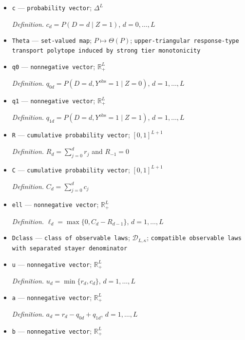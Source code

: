 \documentclass{article}
\begin{document}
\begin{itemize}
  \par\smallskip\noindent\emph{Definition.} \(r_d=P(D=d\mid Z=0)\), \(d=0,\ldots,L\)
  \item \texttt{c} --- \texttt{probability vector}; \(\Delta^{L}\)
  \par\smallskip\noindent\emph{Definition.} \(c_d=P(D=d\mid Z=1)\), \(d=0,\ldots,L\)
  \item \texttt{Theta} --- \texttt{set-\allowbreak{}valued map}; \(P\mapsto\Theta(P)\); \texttt{upper-\allowbreak{}triangular response-\allowbreak{}type transport polytope induced by strong tier monotonicity}
  \item \texttt{q0} --- \texttt{nonnegative vector}; \(\mathbb R_+^{L}\)
  \par\smallskip\noindent\emph{Definition.} \(q_{0d}=P(D=d,Y^{\mathrm{obs}}=1\mid Z=0)\), \(d=1,\ldots,L\)
  \item \texttt{q1} --- \texttt{nonnegative vector}; \(\mathbb R_+^{L}\)
  \par\smallskip\noindent\emph{Definition.} \(q_{1d}=P(D=d,Y^{\mathrm{obs}}=1\mid Z=1)\), \(d=1,\ldots,L\)
  \item \texttt{R} --- \texttt{cumulative probability vector}; \([0,1]^{L+1}\)
  \par\smallskip\noindent\emph{Definition.} \(R_d=\sum_{j=0}^{d}r_j\) and \(R_{-1}=0\)
  \item \texttt{C} --- \texttt{cumulative probability vector}; \([0,1]^{L+1}\)
  \par\smallskip\noindent\emph{Definition.} \(C_d=\sum_{j=0}^{d}c_j\)
  \item \texttt{ell} --- \texttt{nonnegative vector}; \(\mathbb R_+^{L}\)
  \par\smallskip\noindent\emph{Definition.} \(\ell_d=\max\{0,C_d-R_{d-1}\}\), \(d=1,\ldots,L\)
  \item \texttt{Dclass} --- \texttt{class of observable laws}; \(\mathcal D_{L,\kappa}\); \texttt{compatible observable laws with separated stayer denominator}
  \item \texttt{u} --- \texttt{nonnegative vector}; \(\mathbb R_+^{L}\)
  \par\smallskip\noindent\emph{Definition.} \(u_d=\min\{r_d,c_d\}\), \(d=1,\ldots,L\)
  \item \texttt{a} --- \texttt{nonnegative vector}; \(\mathbb R_+^{L}\)
  \par\smallskip\noindent\emph{Definition.} \(a_d=r_d-q_{0d}+q_{1d}\), \(d=1,\ldots,L\)
  \item \texttt{b} --- \texttt{nonnegative vector}; \(\mathbb R_+^{L}\)

\end{itemize}
\end{document}
